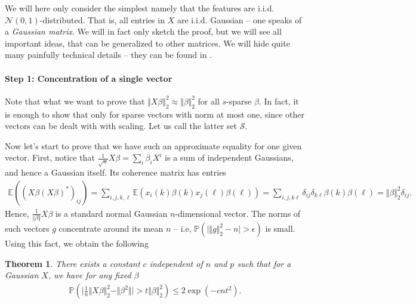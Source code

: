 \documentclass{article}
\newcommand{\calS}{\mathcal{S}}
\newtheorem{theorem}{Theorem}
\newcommand{\abs}[1]{\vert #1 \vert}
\newcommand{\norm}[1]{\Vert #1 \Vert}
\begin{document}
We will here only consider the simplest namely that the features are i.i.d. $\mathcal{N}(0,1)$-distributed. That is, all entries in $X$ are i.i.d. Gaussian -- one speaks of a \emph{Gaussian matrix}. We will in fact only sketch the proof, but we will see all important ideas, that can be generalized to other matrices. We will hide quite many painfully technical details -- they can be found in \cite[Ch. 9.1]{foucart2011hard}.

\paragraph{Step 1: Concentration of a single vector} Note that what we want to prove that $\norm{X\beta}_2^2 \approx \norm{\beta}_2^2$ for all $s$-sparse $\beta$. In fact, it is enough to show that only for sparse vectors with norm at most one, since other vectors can be dealt with with scaling. Let us call the latter set $\calS$.

Now let's start to prove that we have such an approximate equality for one given vector. First, notice that $\tfrac{1}{\sqrt{n}} X\beta = \sum_{i} \beta_i X^i$ is a sum of independent Gaussians, and hence a Gaussian itself. Its coherence matrix has entries
\begin{align*}
    \mathbb{E}((X\beta(X\beta)^*)_{ij}) = \sum_{i,j,k,\ell} \mathbb{E}(x_i(k) \beta(k) x_j(\ell) \beta(\ell)) =  \sum_{i,j,k\ell} \delta_{ij}\delta_{k\ell} \beta(k) \beta(\ell) = \norm{\beta}_2^2 \delta_{ij}.
\end{align*}
Hence, $\frac{1}{\norm{\beta}}X\beta$ is a standard normal Gaussian $n$-dimensional vector. The norms of such vectors $g$ concentrate around its mean $n$ -- i.e, $\mathbb{P}( \abs{\norm{g}_2^2 - n}> \epsilon)$ is small. Using this fact, we obtain the following
\begin{theorem}
    There exists a constant $c$ independent of $n$ and $p$ such that for a Gaussian $X$, we have for any fixed $\beta$
    \begin{align}
        \mathbb{P}(\abs{\frac{1}{n} \norm{X\beta}_2^2 - \norm{\beta^2}} >t\norm{\beta}^2_2) \leq 2\exp(-cnt^2). \label{eq:conc}
    \end{align}
\end{theorem}
\end{document}
